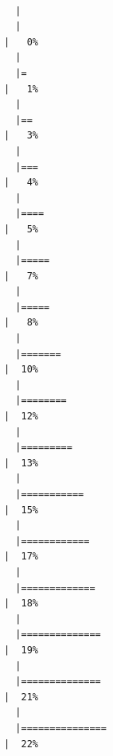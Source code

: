 \documentclass[
  letterpaper,
  DIV=11,
  numbers=noendperiod]{scrartcl}
\begin{document}
\begin{verbatim}

  |                                                                            
  |                                                                      |   0%
  |                                                                            
  |=                                                                     |   1%
  |                                                                            
  |==                                                                    |   3%
  |                                                                            
  |===                                                                   |   4%
  |                                                                            
  |====                                                                  |   5%
  |                                                                            
  |=====                                                                 |   7%
  |                                                                            
  |=====                                                                 |   8%
  |                                                                            
  |=======                                                               |  10%
  |                                                                            
  |========                                                              |  12%
  |                                                                            
  |=========                                                             |  13%
  |                                                                            
  |===========                                                           |  15%
  |                                                                            
  |============                                                          |  17%
  |                                                                            
  |=============                                                         |  18%
  |                                                                            
  |==============                                                        |  19%
  |                                                                            
  |==============                                                        |  21%
  |                                                                            
  |===============                                                       |  22%

\end{verbatim}
\end{document}
